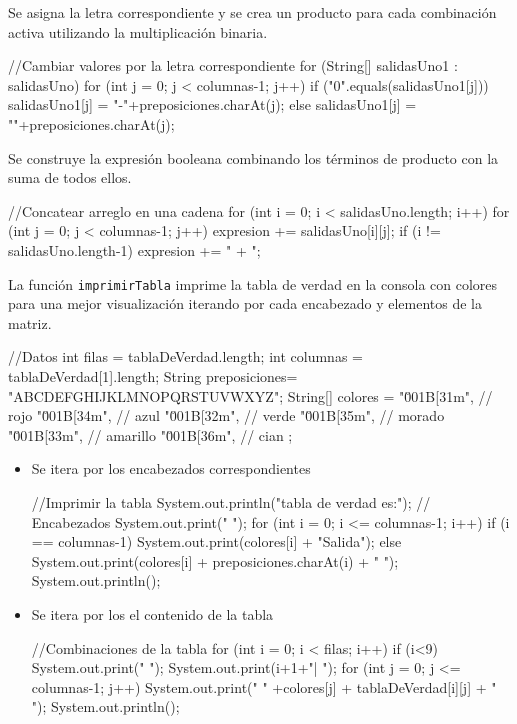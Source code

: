 Se asigna la letra correspondiente y se crea un producto para cada combinación activa utilizando la multiplicación binaria.
\begin{javaCode}
//Cambiar valores por la letra correspondiente
    for (String[] salidasUno1 : salidasUno) {
        for (int j = 0; j < columnas-1; j++) {
            if ("0".equals(salidasUno1[j])) {
                salidasUno1[j] = "-"+preposiciones.charAt(j);
            } else {
                salidasUno1[j] = ""+preposiciones.charAt(j);
            }
        }
    }
\end{javaCode}

Se construye la expresión booleana combinando los términos de producto con la suma de todos ellos.
\begin{javaCode}
//Concatear arreglo en una cadena
for (int i = 0; i < salidasUno.length; i++) {
    for (int j = 0; j < columnas-1; j++) {
        expresion += salidasUno[i][j];
    }
    if (i != salidasUno.length-1) {
        expresion += " + ";
    }
}
\end{javaCode}
La función \texttt{imprimirTabla} imprime la tabla de verdad en la consola con colores para una mejor visualización iterando por cada  encabezado y elementos de la matriz.
\begin{javaCode}
//Datos
    int filas = tablaDeVerdad.length;
    int columnas = tablaDeVerdad[1].length;
    String preposiciones= "ABCDEFGHIJKLMNOPQRSTUVWXYZ";
    String[] colores = {
        "\u001B[31m", // rojo
        "\u001B[34m", // azul
        "\u001B[32m", // verde
        "\u001B[35m", // morado
        "\u001B[33m", // amarillo
        "\u001B[36m", // cian
    };
\end{javaCode}
\begin{itemize}
       \item[{\ieeeguilsinglright}] {\it } Se itera por los encabezados correspondientes
\begin{javaCode}    
    //Imprimir la tabla
    System.out.println("\nLa tabla de verdad es:");
    // Encabezados
    System.out.print("     ");
    for (int i = 0; i <= columnas-1; i++) {
        if (i == columnas-1) {
            System.out.print(colores[i] + "Salida");
        }else{
            System.out.print(colores[i] + preposiciones.charAt(i) + "  ");
        }
    }
    System.out.println();
\end{javaCode}
    \item[{\ieeeguilsinglright}] {\it } Se itera por los el contenido de la tabla
\begin{javaCode}
    //Combinaciones de la tabla
    for (int i = 0; i < filas; i++) {
        if (i<9) {
            System.out.print(" ");
        }
        System.out.print(i+1+"| ");
        for (int j = 0; j <= columnas-1; j++) {
            System.out.print(" " +colores[j] + tablaDeVerdad[i][j] + " ");
        }
        System.out.println();
    }
\end{javaCode}
\end{itemize}
\newpage

